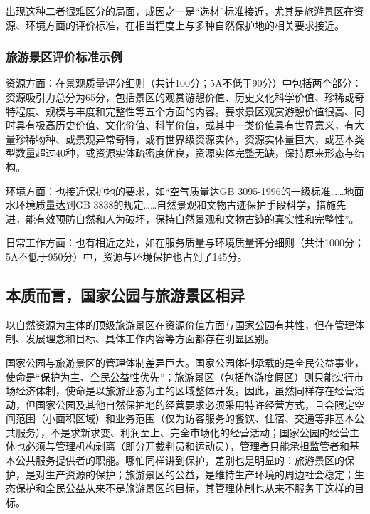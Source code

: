 \documentclass[]{book}
\begin{document}
出现这种二者很难区分的局面，成因之一是``选材''标准接近，尤其是旅游景区在资源、环境方面的评价标准，在相当程度上与多种自然保护地的相关要求接近。

\hypertarget{ux65c5ux6e38ux666fux533aux8bc4ux4ef7ux6807ux51c6ux793aux4f8b}{%
\subsubsection{旅游景区评价标准示例}\label{ux65c5ux6e38ux666fux533aux8bc4ux4ef7ux6807ux51c6ux793aux4f8b}}

资源方面：在景观质量评分细则（共计100分；5A不低于90分）中包括两个部分：资源吸引力总分为65分，包括景区的观赏游憩价值、历史文化科学价值、珍稀或奇特程度、规模与丰度和完整性等五个方面的内容。要求景区观赏游憩价值很高、同时具有极高历史价值、文化价值、科学价值，或其中一类价值具有世界意义，有大量珍稀物种、或景观异常奇特，或有世界级资源实体，资源实体量巨大，或基本类型数量超过40种，或资源实体疏密度优良，资源实体完整无缺，保持原来形态与结构。

环境方面：也接近保护地的要求，如``空气质量达GB 3095-1996的一级标准\ldots{}\ldots{}地面水环境质量达到GB 3838的规定\ldots{}\ldots{}自然景观和文物古迹保护手段科学，措施先进，能有效预防自然和人为破坏，保持自然景观和文物古迹的真实性和完整性''。

日常工作方面：也有相近之处，如在服务质量与环境质量评分细则（共计1000分；5A不低于950分）中，资源与环境保护也占到了145分。

\hypertarget{ux672cux8d28ux800cux8a00ux56fdux5bb6ux516cux56edux4e0eux65c5ux6e38ux666fux533aux76f8ux5f02}{%
\subsection{本质而言，国家公园与旅游景区相异}\label{ux672cux8d28ux800cux8a00ux56fdux5bb6ux516cux56edux4e0eux65c5ux6e38ux666fux533aux76f8ux5f02}}

以自然资源为主体的顶级旅游景区在资源价值方面与国家公园有共性，但在管理体制、发展理念和目标、具体工作内容等方面都存在明显区别。

国家公园与旅游景区的管理体制差异巨大。国家公园体制承载的是全民公益事业，使命是``保护为主、全民公益性优先''；旅游景区（包括旅游度假区）则只能实行市场经济体制，使命是以旅游业态为主的区域整体开发。因此，虽然同样存在经营活动，但国家公园及其他自然保护地的经营要求必须采用特许经营方式，且会限定空间范围（小面积区域）和业务范围（仅为访客服务的餐饮、住宿、交通等非基本公共服务），不是求新求变、利润至上、完全市场化的经营活动；国家公园的经营主体也必须与管理机构剥离（即分开裁判员和运动员），管理者只能承担监管者和基本公共服务提供者的职能。哪怕同样讲到保护，差别也是明显的：旅游景区的保护，是对生产资源的保护；旅游景区的公益，是维持生产环境的周边社会稳定；生态保护和全民公益从来不是旅游景区的目标，其管理体制也从来不服务于这样的目标。
\end{document}
